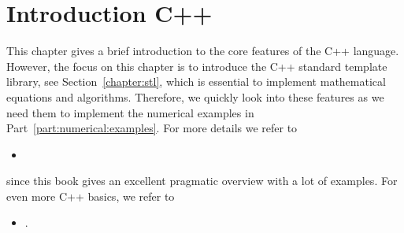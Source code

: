 %




\chapter{Introduction C++}
This chapter gives a brief introduction to the core features of the C++ language. However, the focus on this chapter is to introduce the C++ standard template library, see Section~\ref{chapter:stl}, which is essential to implement mathematical equations and algorithms. Therefore, we quickly look into these features as we need them to implement the numerical examples in Part~\ref{part:numerical:examples}. For more details we refer to
\begin{itemize}
\item {}
\end{itemize}
since this book gives an excellent pragmatic overview with a lot of examples. For even more C++ basics, we refer to
\begin{itemize}
\item {}.
\end{itemize}
